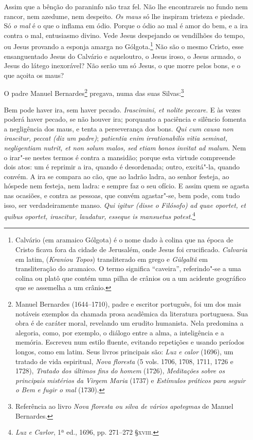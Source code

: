 Assim que a bênção do paraninfo não traz fel. Não lhe
encontrareis no fundo nem rancor, nem azedume, nem despeito. \textit{Os
maus} só lhe inspiram tristeza e piedade. Só \textit{o mal} é o que o
inflama em ódio. Porque o ódio ao mal é amor do bem, e a ira contra o
mal, entusiasmo divino. Vede Jesus despejando os vendilhões do tempo,
ou Jesus provando a esponja amarga no Gólgota.\footnote{ Calvário (em
aramaico Gólgota) é o nome dado à colina que na época de
Cristo ficava fora da cidade de
Jerusalém, onde Jesus
foi crucificado. \textit{Calvaria} em latim,
(\textit{Kraniou Topos}) transliterado em grego e \textit{Gûlgaltâ} 
em transliteração do aramaico. O termo significa “caveira”,
referindo"-se a uma colina ou platô que contém uma pilha de crânios ou a
um acidente geográfico que se assemelha a um crânio.} Não são o
mesmo Cristo, esse ensanguentado Jesus do Calvário e aqueloutro, o
Jesus iroso, o Jesus armado, o Jesus do látego inexorável? Não serão um
só Jesus, o que morre pelos bons, e o que açoita os maus?

O padre Manuel Bernardes\footnote{ Manuel Bernardes (1644--1710), padre e
escritor português, foi um dos mais notáveis exemplos da
chamada prosa acadêmica da literatura portuguesa. Sua obra é de caráter
moral, revelando um erudito humanista. Nela
predomina a alegoria, como, por exemplo, o diálogo entre a alma, a
inteligência e a memória. Escreveu num estilo fluente, evitando
repetições e usando períodos longos, como em latim. Seus livros
principais são: \textit{Luz e calor} (1696), um tratado de vida espiritual, \textit{Nova
floresta} (5 vols. 1706, 1708, 1711, 1726 e 1728), \textit{Tratado dos últimos
fins do homem} (1726), \textit{Meditações sobre os principais mistérios da
Virgem Maria} (1737) e \textit{Estímulos práticos para seguir o Bem e fugir o
mal} (1730).} pregava, numa das suas Silvas:\footnote{  Referência
ao livro \textit{Nova floresta ou silva de vários apotegmas} de Manuel
Bernardes.}

\begin{hedraquote}
Bem pode haver ira, sem haver pecado. \textit{Irascimini,
et nolite peccare.} E às vezes poderá haver pecado, se não houver ira;
porquanto a paciência e silêncio fomenta a negligência dos maus, e
tenta a perseverança dos bons. \textit{Qui cum causa non irascitur,
peccat (diz um padre)};\textit{ patientia enim irrationabilis vitia
seminat, negligentiam nutrit, et non solum malos, sed etiam bonos
invitat ad malum}. Nem o irar"-se nestes termos é
contra a mansidão; porque esta virtude compreende dois atos: um é
reprimir a ira, quando é desordenada; outro, excitá"-la, quando convém.
A ira se compara ao cão, que ao ladrão ladra, ao senhor festeja, ao
hóspede nem festeja, nem ladra: e sempre faz o seu ofício. E assim quem
se agasta nas ocasiões, e contra as pessoas, que convém agastar"-se, bem
pode, com tudo isso, ser verdadeiramente manso. \textit{Qui igitur
(disse o Filósofo) ad quae oportet, et quibus oportet, irascitur,
laudatur, esseque is mansuetus potest.}\footnote{
\textit{Luz e Carlor}, 1ª ed., 1696, pp. 271--272 \S \textsc{xviii}.}
\end{hedraquote}


